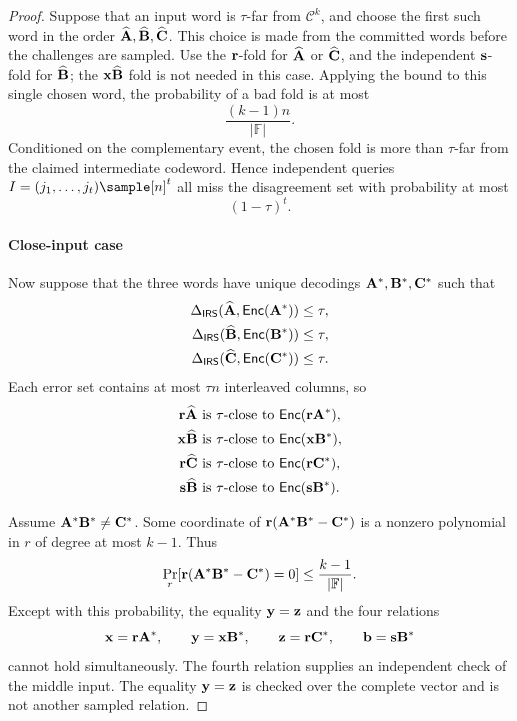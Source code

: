 \begin{revblock}
\begin{proof}
Suppose that an input word is \(\tau\)-far from \(\mathcal C^k\), and choose
the first such word in the order
\(\widehat{\mathbf A},\widehat{\mathbf B},\widehat{\mathbf C}\).  This choice is made
from the committed words before the challenges are sampled.  Use the
\(\mathbf r\)-fold for \(\widehat{\mathbf A}\) or \(\widehat{\mathbf C}\), and the
independent \(\mathbf s\)-fold for \(\widehat{\mathbf B}\); the
\(\mathbf x\widehat{\mathbf B}\) fold is not needed in this case.  Applying the
bound to this single chosen word, the probability of a bad fold is at most
\[
 \frac{(k-1)n}{|\mathbb F|}.
\]
Conditioned on the complementary event, the chosen fold is more than
\(\tau\)-far from the claimed intermediate codeword.  Hence independent
queries \(I=(j_1,\ldots,j_t)\sample[n]^t\) all miss the disagreement set with
probability at most
\[
 (1-\tau)^t.
\]

\paragraph{Close-input case}
Now suppose that the three words have unique decodings
\(\mathbf A^*,\mathbf B^*,\mathbf C^*\) such that
\[
\begin{aligned}
 \Delta_{\mathsf{IRS}}(\widehat{\mathbf A},\mathsf{Enc}(\mathbf A^*))&\le\tau,\\
 \Delta_{\mathsf{IRS}}(\widehat{\mathbf B},\mathsf{Enc}(\mathbf B^*))&\le\tau,\\
 \Delta_{\mathsf{IRS}}(\widehat{\mathbf C},\mathsf{Enc}(\mathbf C^*))&\le\tau.
\end{aligned}
\]
Each error set contains at most \(\tau n\) interleaved columns, so
\[
\begin{aligned}
 \mathbf r\widehat{\mathbf A}&\text{ is $\tau$-close to }
   \mathsf{Enc}(\mathbf r\mathbf A^*),\\
 \mathbf x\widehat{\mathbf B}&\text{ is $\tau$-close to }
   \mathsf{Enc}(\mathbf x\mathbf B^*),\\
 \mathbf r\widehat{\mathbf C}&\text{ is $\tau$-close to }
   \mathsf{Enc}(\mathbf r\mathbf C^*),\\
 \mathbf s\widehat{\mathbf B}&\text{ is $\tau$-close to }
   \mathsf{Enc}(\mathbf s\mathbf B^*).
\end{aligned}
\]

Assume \(\mathbf A^*\mathbf B^*\ne\mathbf C^*\).  Some coordinate of
\(\mathbf r(\mathbf A^*\mathbf B^*-\mathbf C^*)\) is a nonzero polynomial in \(r\) of
degree at most \(k-1\).  Thus
\[
 \Pr_r[\mathbf r(\mathbf A^*\mathbf B^*-\mathbf C^*)=0]
 \le\frac{k-1}{|\mathbb F|}.
\]
Except with this probability, the equality \(\mathbf y=\mathbf z\) and the four
relations
\[
 \mathbf x=\mathbf r\mathbf A^*,\qquad
 \mathbf y=\mathbf x\mathbf B^*,\qquad
 \mathbf z=\mathbf r\mathbf C^*,\qquad
 \mathbf b=\mathbf s\mathbf B^*
\]
cannot hold simultaneously.  The fourth relation supplies an independent
check of the middle input.  The equality \(\mathbf y=\mathbf z\) is checked over
the complete vector and is not another sampled relation.


\end{proof}
\end{revblock}
